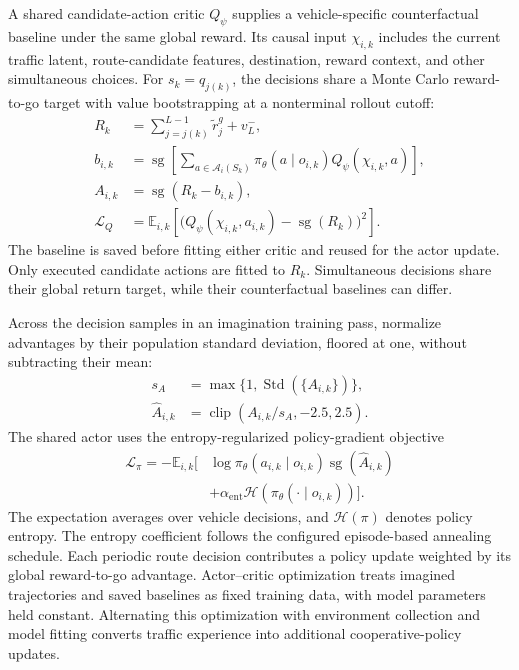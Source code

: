 A shared candidate-action critic $Q_\psi$ supplies a vehicle-specific
counterfactual baseline under the same global reward. Its causal input
$\chi_{i,k}$ includes the current traffic latent, route-candidate
features, destination, reward context, and other simultaneous choices.
For $s_k=q_{j(k)}$, the decisions share a Monte Carlo reward-to-go target
with value bootstrapping at a nonterminal rollout cutoff:
\begin{equation}
 \begin{aligned}
 R_k&=\sum_{j=j(k)}^{L-1}\widetilde r_j^g+v_L^-,\\
 b_{i,k}&=\operatorname{sg}\!\left[
    \sum_{a\in\mathcal A_i(S_k)}
       \pi_\theta(a\mid o_{i,k})Q_\psi(\chi_{i,k},a)\right],\\
 A_{i,k}&=\operatorname{sg}(R_k-b_{i,k}),\\
 \mathcal L_Q&=\mathbb E_{i,k}\!\left[
      \bigl(Q_\psi(\chi_{i,k},a_{i,k})
                   -\operatorname{sg}(R_k)\bigr)^2\right].
 \end{aligned}
 \label{eq:counterfactual-global-advantage}
\end{equation}
The baseline is saved before fitting either critic and reused for the
actor update. Only executed candidate actions are fitted to $R_k$.
Simultaneous decisions share their global return target, while their
counterfactual baselines can differ.

Across the decision samples in an imagination training pass, normalize
advantages by their population standard deviation, floored at one,
without subtracting their mean:
\begin{equation}
 \begin{aligned}
 s_A&=\max\{1,\operatorname{Std}(\{A_{i,k}\})\},\\
 \widehat A_{i,k}&=\operatorname{clip}(A_{i,k}/s_A,-2.5,2.5).
 \end{aligned}
 \label{eq:global-advantage-scaling}
\end{equation}
The shared actor uses the entropy-regularized policy-gradient objective
\begin{equation}
 \begin{aligned}
 \mathcal L_\pi=-\mathbb E_{i,k}\bigl[
    &\log\pi_\theta(a_{i,k}\mid o_{i,k})
                 \operatorname{sg}(\widehat A_{i,k})\\
    &+\alpha_{\mathrm{ent}}\mathcal H(
                 \pi_\theta(\cdot\mid o_{i,k}))\bigr].
 \end{aligned}
 \label{eq:next-hop-actor-loss}
\end{equation}
The expectation averages over vehicle decisions, and $\mathcal H(\pi)$
denotes policy entropy. The entropy coefficient follows the configured
episode-based annealing schedule. Each periodic route decision
contributes a policy update weighted by its global reward-to-go advantage.
Actor--critic optimization treats imagined trajectories and saved
baselines as fixed training data, with model parameters held constant.
Alternating this optimization with environment collection and model
fitting converts traffic experience into additional cooperative-policy
updates.
